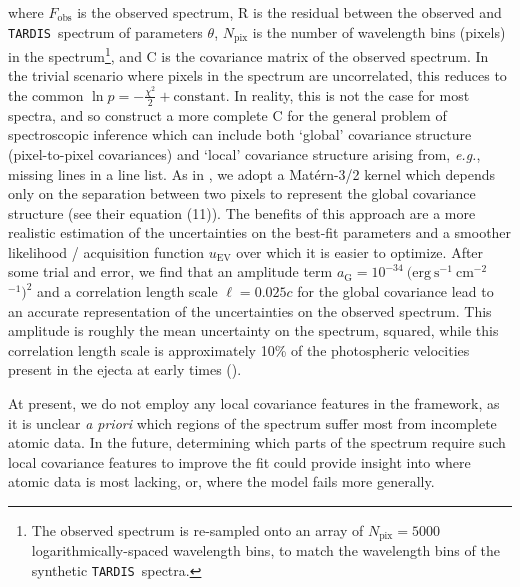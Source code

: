 \documentclass[twocolumn, twocolappendix]{aastex63}
\def\TARDIS{\texttt{TARDIS}}
\def\eg{{\it e.g.}}
\begin{document}
\noindent where $F_{\mathrm{obs}}$ is the observed spectrum, $\mathrm{R}$ is the residual between the observed and \TARDIS~spectrum of parameters $\theta$, $N_{\mathrm{pix}}$ is the number of wavelength bins (pixels) in the spectrum\footnote{The observed spectrum is re-sampled onto an array of $N_{\mathrm{pix}} = 5000$ logarithmically-spaced wavelength bins, to match the wavelength bins of the synthetic \TARDIS~spectra.}, and $\mathrm{C}$ is the covariance matrix of the observed spectrum. In the trivial scenario where pixels in the spectrum are uncorrelated, this reduces to the common $\ln p = -\frac{\chi^2}{2} + \mathrm{constant}$. In reality, this is not the case for most spectra, and so \cite{czekala15} construct a more complete $\mathrm{C}$ for the general problem of spectroscopic inference which can include both `global' covariance structure (pixel-to-pixel covariances) and `local' covariance structure arising from, \eg, missing lines in a line list. As in \cite{czekala15}, we adopt a Mat{\'e}rn-3/2 kernel which depends only on the separation between two pixels to represent the global covariance structure (see their equation (11)). The benefits of this approach are a more realistic estimation of the uncertainties on the best-fit parameters and a smoother likelihood / acquisition function $u_{\mathrm{EV}}$ over which it is easier to optimize. After some trial and error, we find that an amplitude term $a_{\mathrm{G}} = 10^{-34}~(\mathrm{erg~s^{-1}~cm^{-2}}$~\text{\AA}${}^{-1})^{2}$ and a correlation length scale $\ell = 0.025c$ for the global covariance lead to an accurate representation of the uncertainties on the observed spectrum. This amplitude is roughly the mean uncertainty on the spectrum, squared, while this correlation length scale is approximately 10\% of the photospheric velocities present in the ejecta at early times (\citealt{watson19}).

At present, we do not employ any local covariance features in the \cite{czekala15} framework, as it is unclear \textit{a priori} which regions of the spectrum suffer most from incomplete atomic data. In the future, determining which parts of the spectrum require such local covariance features to improve the fit could provide insight into where atomic data is most lacking, or, where the model fails more generally.




\end{document}
